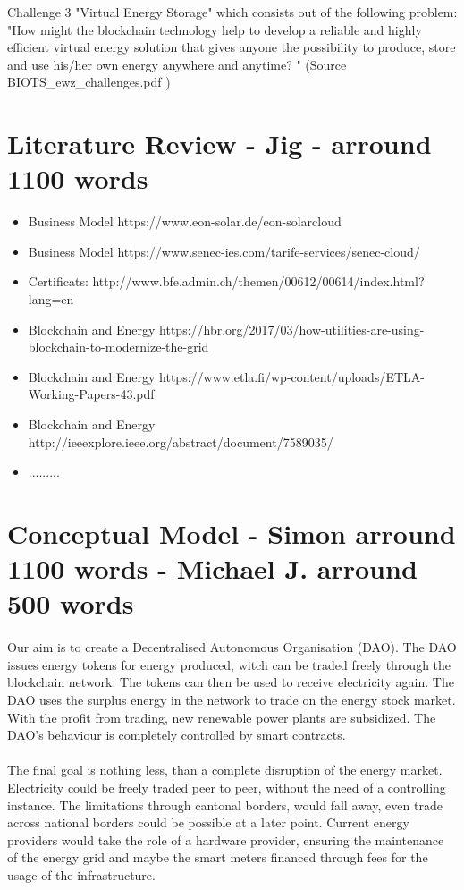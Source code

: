 \documentclass{scrartcl}
\begin{document}
    Challenge 3 "Virtual Energy Storage" which consists out of the following problem:  "How might the blockchain technology help to develop a reliable and highly efficient virtual energy solution that gives anyone the possibility to produce, store and use his/her own energy anywhere and anytime? " (Source BIOTS\_ewz\_challenges.pdf )

	\section{Literature Review - Jig - arround 1100 words}
    
    \begin{itemize}
    \item Business Model https://www.eon-solar.de/eon-solarcloud
    \item Business Model https://www.senec-ies.com/tarife-services/senec-cloud/
    \item Certificats: http://www.bfe.admin.ch/themen/00612/00614/index.html?lang=en
    \item Blockchain and Energy https://hbr.org/2017/03/how-utilities-are-using-blockchain-to-modernize-the-grid
    \item Blockchain and Energy https://www.etla.fi/wp-content/uploads/ETLA-Working-Papers-43.pdf
    \item Blockchain and Energy http://ieeexplore.ieee.org/abstract/document/7589035/
    \item .........
    \end{itemize}
	
	\section{Conceptual Model - Simon arround 1100 words - Michael J. arround 500 words}
	
	\paragraph{}
	Our aim is to create a Decentralised Autonomous Organisation (DAO). The DAO issues energy tokens for energy produced, witch can be traded freely through the blockchain network. The tokens can then be used to receive electricity again. The DAO uses the surplus energy in the network to trade on the energy stock market. With the profit from trading, new renewable power plants are subsidized. The DAO's behaviour is completely controlled by smart contracts.
	
	\paragraph{}
	The final goal is nothing less, than a complete disruption of the energy market. Electricity could be freely traded peer to peer, without the need of a controlling instance. The limitations through cantonal borders, would fall away, even trade across national borders could be possible at a later point. Current energy providers would take the role of a hardware provider, ensuring the maintenance of the energy grid and maybe the smart meters financed through fees for the usage of the infrastructure. 
	
\end{document}
